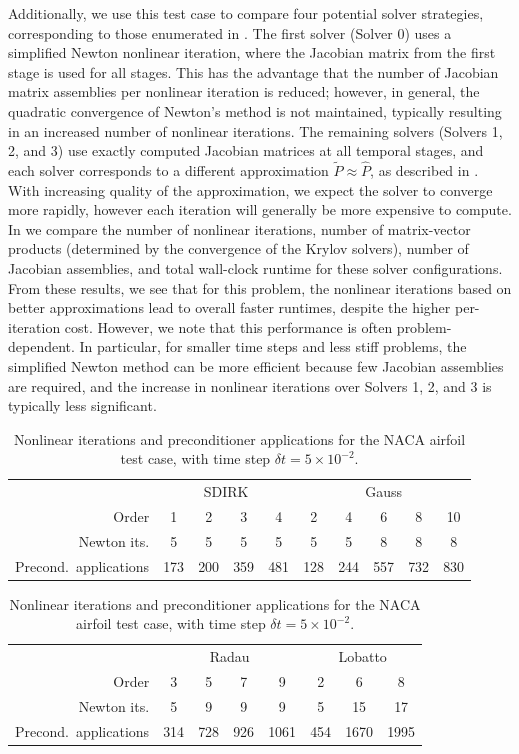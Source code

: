 \documentclass[review]{siamart}
\begin{document}
Additionally, we use this test case to compare four potential solver strategies,
corresponding to those enumerated in . The first solver
(Solver 0) uses a simplified Newton nonlinear iteration, where the Jacobian matrix
from the first stage is used for all stages. This has the advantage that the
number of Jacobian matrix assemblies per nonlinear iteration is reduced;
however, in general, the quadratic convergence of Newton's method is not
maintained, typically resulting in an increased number of nonlinear iterations.
The remaining solvers (Solvers 1, 2, and 3) use exactly computed Jacobian
matrices at all temporal stages, and each solver corresponds to a different
approximation $\tilde{P} \approx \widehat{P}$, as described in
. With increasing quality of the approximation, we
expect the solver to converge more rapidly, however each iteration will
generally be more expensive to compute. In  we
compare the number of nonlinear iterations, number of matrix-vector products
(determined by the convergence of the Krylov solvers), number of Jacobian
assemblies, and total wall-clock runtime for these solver configurations. From
these results, we see that for this problem, the nonlinear iterations based on
better approximations lead to overall faster runtimes, despite the higher
per-iteration cost. However, we note that this performance is often
problem-dependent. In particular, for smaller time steps and less stiff
problems, the simplified Newton method can be more efficient because few Jacobian
assemblies are required, and the increase in nonlinear iterations over
Solvers 1, 2, and 3 is typically less significant.

\begin{table}
	\centering
	\caption{Nonlinear iterations and preconditioner applications for the NACA airfoil test case, with time step $\delta t = 5 \times 10^{-2}.$}
	\label{tab:naca-iters}
	\begin{tabular}{r|cccc|ccccc}
		\toprule
		& \multicolumn{4}{c|}{SDIRK} & \multicolumn{5}{c}{Gauss} \\
		Order  & 1 & 2 & 3 & 4 & 2 & 4 & 6 & 8 & 10\\
		\midrule
		Newton its. & 5 & 5 & 5 & 5 & 5 & 5 & 8 & 8 & 8\\
		\midrule
		Precond.\ applications & 173 & 200 & 359 & 481 & 128 & 244 & 557 & 732 & 830\\
		\bottomrule
	\end{tabular}

	\vspace{\floatsep}

	\begin{tabular}{r|cccc|ccc}
		\toprule
		& \multicolumn{4}{c|}{Radau} & \multicolumn{3}{c}{Lobatto} \\
		Order  & 3 & 5 & 7 & 9 & 2 & 6 & 8\\
		\midrule
		Newton its. & 5 & 9 & 9 & 9 & 5 & 15 & 17\\
		\midrule
		Precond.\ applications & 314 & 728 & 926 & 1061 & 454 & 1670 & 1995\\
		\bottomrule
	\end{tabular}
\end{table}
\end{document}
